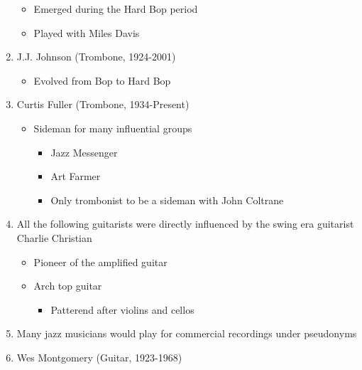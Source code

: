 \documentclass[]{article}
\providecommand{\tightlist}{%
  \setlength{\itemsep}{0pt}\setlength{\parskip}{0pt}}
\begin{document}
\begin{enumerate}
  \begin{itemize}
  \tightlist
  \item
    Emerged during the Hard Bop period
  \item
    Played with Miles Davis
  \end{itemize}
\item
  J.J. Johnson (Trombone, 1924-2001)

  \begin{itemize}
  \tightlist
  \item
    Evolved from Bop to Hard Bop
  \end{itemize}
\item
  Curtis Fuller (Trombone, 1934-Present)

  \begin{itemize}
  \tightlist
  \item
    Sideman for many influential groups

    \begin{itemize}
    \tightlist
    \item
      Jazz Messenger
    \item
      Art Farmer
    \item
      Only trombonist to be a sideman with John Coltrane
    \end{itemize}
  \end{itemize}
\item
  All the following guitarists were directly influenced by the swing era
  guitarist Charlie Christian

  \begin{itemize}
  \tightlist
  \item
    Pioneer of the amplified guitar
  \item
    Arch top guitar

    \begin{itemize}
    \tightlist
    \item
      Patterend after violins and cellos
    \end{itemize}
  \end{itemize}
\item
  Many jazz musicians would play for commercial recordings under
  pseudonyms
\item
  Wes Montgomery (Guitar, 1923-1968)
\end{enumerate}
\end{document}
